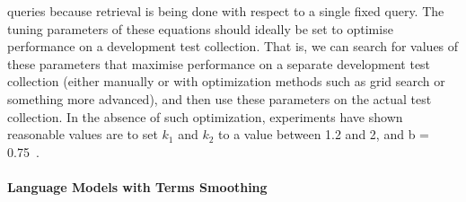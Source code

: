 queries because retrieval is being done with respect to a single fixed query. The tuning parameters of these equations should ideally be set to optimise performance on a development test collection. That is, we can search for values of these parameters that maximise performance on a separate development test collection (either manually or with optimization methods such as grid search or something more advanced), and then use these parameters on the actual test collection. In the absence of such optimization, experiments have shown reasonable values are to set $ k_{1} $ and $ k_{2} $ to a value between 1.2 and 2, and b = 0.75~\citep{manning2008introduction}.

\paragraph{Language Models with Terms Smoothing}
\ \\
